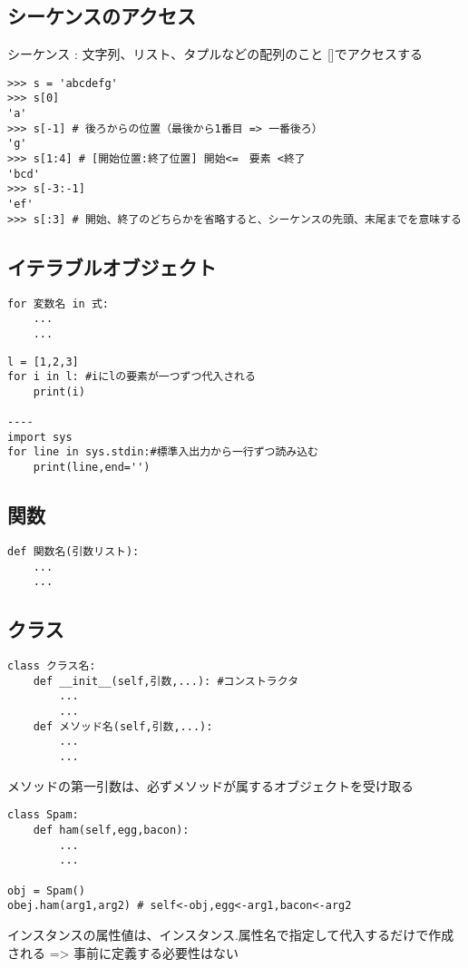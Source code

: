 \documentclass[a4j,here,10pt,oneside,openany]{jsbook}
\begin{document}
\subsection{シーケンスのアクセス}

シーケンス : 文字列、リスト、タプルなどの配列のこと {[}{]}でアクセスする
\begin{framed}
\begin{verbatim}
>>> s = 'abcdefg'
>>> s[0]
'a'
>>> s[-1] # 後ろからの位置（最後から1番目 => 一番後ろ）
'g'
>>> s[1:4] # [開始位置:終了位置] 開始<=　要素 <終了
'bcd'
>>> s[-3:-1]
'ef'
>>> s[:3] # 開始、終了のどちらかを省略すると、シーケンスの先頭、末尾までを意味する
\end{verbatim}
\end{framed}
\subsection{イテラブルオブジェクト}
\begin{framed}
\begin{verbatim}
for 変数名 in 式:
    ...
    ...
\end{verbatim}
\end{framed}
\begin{framed}
\begin{verbatim}
l = [1,2,3]
for i in l: #iにlの要素が一つずつ代入される
    print(i)

----
import sys
for line in sys.stdin:#標準入出力から一行ずつ読み込む
    print(line,end='')
\end{verbatim}
\end{framed}
\subsection{関数}\label{ux95a2ux6570}
\begin{framed}
\begin{verbatim}
def 関数名(引数リスト):
    ...
    ...
\end{verbatim}
\end{framed}
\subsection{クラス}\label{ux30afux30e9ux30b9}
\begin{framed}
\begin{verbatim}
class クラス名:
    def __init__(self,引数,...): #コンストラクタ
        ...
        ...
    def メソッド名(self,引数,...):
        ...
        ...
\end{verbatim}

メソッドの第一引数は、必ずメソッドが属するオブジェクトを受け取る

\begin{verbatim}
class Spam:
    def ham(self,egg,bacon):
        ...
        ...

obj = Spam()
obej.ham(arg1,arg2) # self<-obj,egg<-arg1,bacon<-arg2
\end{verbatim}
\end{framed}
インスタンスの属性値は、インスタンス.属性名で指定して代入するだけで作成される
=\textgreater{} 事前に定義する必要性はない
\end{document}
